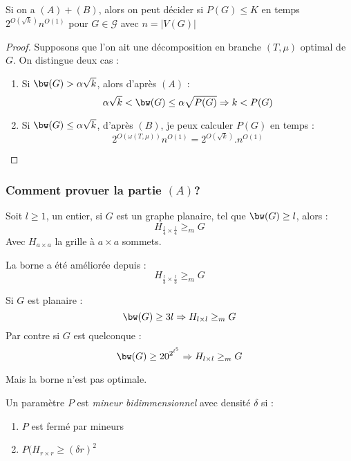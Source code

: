 \documentclass[a4paper, 11pt]{thesis}
\begin{document}
\begin{thrm}
    Si on a $(A) + (B)$, alors on peut décider si $P(G) \leq K$ en temps $2^{O(\sqrt{k})} n^{O(1)}$
    pour $G \in \mathcal{G}$ avec $n = |V(G)|$
\end{thrm}

\begin{proof}
    Supposons que l'on ait une décomposition en branche $(T, \mu)$ optimal de $G$. On distingue deux
    cas : \begin{enumerate}
        \item Si $\bw(G) > \alpha \sqrt{k}$, alors d'après $(A)$ : \[
                \alpha \sqrt{k} < \bw(G) \leq \alpha \sqrt{P(G)} \Rightarrow k < P(G)
            \]
        \item  Si $\bw(G) \leq \alpha \sqrt{k}$, d'après $(B)$, je peux calculer $P(G)$ en temps :
            \[
                2^{O(\omega(T, \mu))} n^{O(1)} = 2^{O(\sqrt{k})} . n^{O(1)}
            \]
    \end{enumerate}
\end{proof}

\subsubsection{Comment provuer la partie $(A)$?}

\begin{thrm}
    Soit $l \geq 1$, un entier, si $G$ est un graphe planaire, tel que $\bw(G) \geq l$, alors : \[
        H_{\frac{l}{4} \times \frac{l}{4}} \geq_m G
    \]
    Avec $H_{a \times a}$ la grille à $a \times a$ sommets.
\end{thrm}

La borne a été améliorée depuis : \[
    H_{\frac{l}{3} \times \frac{l}{3}} \geq_m G
    \]

Si $G$ est planaire : \[
    \bw(G) \geq 3l \Rightarrow H_{l \times l} \geq_m G
\]
Par contre si $G$ est quelconque : \[
    \bw(G) \geq 20^{2^{l^5}} \Rightarrow H_{l \times l} \geq_m G
\]

Mais la borne n'est pas optimale.

\begin{ex}[\kvcover]
\end{ex}

\begin{df} 
    Un paramètre $P$ est \emph{mineur bidimmensionnel} avec densité $\delta$ si : \begin{enumerate}
        \item $P$ est fermé par mineurs
        \item $P(H_{r \times r} \geq (\delta r)^2$
    \end{enumerate}
\end{df}
\end{document}
